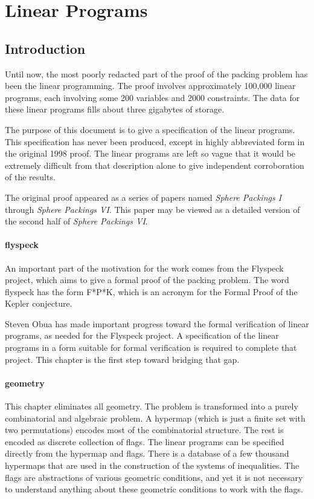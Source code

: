 
\chapter{Linear Programs}
    \label{sec:lp}


\section{Introduction}

Until now, the most poorly redacted part of the proof of the
packing problem has been the linear programming.  The proof
involves approximately 100,000 linear programs, each involving
some 200 variables and 2000 constraints.  The data for these
linear programs fills about three gigabytes of storage.

The purpose of this document is to give a specification of the
linear programs. This specification has never been produced,
except in highly abbreviated form in the original 1998 proof. The
linear programs are left so vague that it would be extremely
difficult from that description alone to give independent
corroboration of the results.

The original proof appeared as a series of papers named {\it
Sphere Packings I} through {\it Sphere Packings VI}.  This paper
may be viewed as a detailed version of the second half of 
{\it Sphere Packings VI}.

\subsubsection{flyspeck}

An important part of the motivation for the work comes from the
Flyspeck project, which aims to give a formal proof of the packing
problem.  The word flyspeck has the form F*P*K, which is an
acronym for the Formal Proof of the Kepler conjecture.

Steven Obua has made important progress toward the formal
verification of linear programs, as needed for the Flyspeck
project.  A specification
of the linear programs in a form suitable for formal verification
is required to complete that project.
This chapter is the first step toward bridging that gap.

\subsubsection{geometry}

This chapter eliminates all geometry.  The problem is transformed
into a purely combinatorial and algebraic problem.
A hypermap (which is just a finite set
with two permutations) encodes most of the combinatorial
structure.  The rest is encoded as discrete collection of flags.
The linear programs can be specified directly from the hypermap
and flags.  There is a database of a few thousand hypermaps that
are used in the construction of the systems of inequalities.  The
flags are abstractions of various geometric conditions, and yet
it is not necessary to understand anything about these geometric
conditions to work with the flags.

